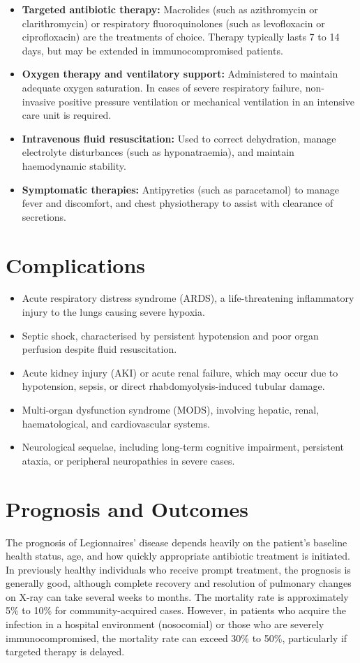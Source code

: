 \begin{itemize}
    \item \textbf{Targeted antibiotic therapy:} Macrolides (such as azithromycin or clarithromycin) or respiratory fluoroquinolones (such as levofloxacin or ciprofloxacin) are the treatments of choice. Therapy typically lasts 7 to 14 days, but may be extended in immunocompromised patients.
    \item \textbf{Oxygen therapy and ventilatory support:} Administered to maintain adequate oxygen saturation. In cases of severe respiratory failure, non-invasive positive pressure ventilation or mechanical ventilation in an intensive care unit is required.
    \item \textbf{Intravenous fluid resuscitation:} Used to correct dehydration, manage electrolyte disturbances (such as hyponatraemia), and maintain haemodynamic stability.
    \item \textbf{Symptomatic therapies:} Antipyretics (such as paracetamol) to manage fever and discomfort, and chest physiotherapy to assist with clearance of secretions.
\end{itemize}

\section*{Complications}
\begin{itemize}
    \item Acute respiratory distress syndrome (ARDS), a life-threatening inflammatory injury to the lungs causing severe hypoxia.
    \item Septic shock, characterised by persistent hypotension and poor organ perfusion despite fluid resuscitation.
    \item Acute kidney injury (AKI) or acute renal failure, which may occur due to hypotension, sepsis, or direct rhabdomyolysis-induced tubular damage.
    \item Multi-organ dysfunction syndrome (MODS), involving hepatic, renal, haematological, and cardiovascular systems.
    \item Neurological sequelae, including long-term cognitive impairment, persistent ataxia, or peripheral neuropathies in severe cases.
\end{itemize}

\section*{Prognosis and Outcomes}
The prognosis of Legionnaires' disease depends heavily on the patient's baseline health status, age, and how quickly appropriate antibiotic treatment is initiated. In previously healthy individuals who receive prompt treatment, the prognosis is generally good, although complete recovery and resolution of pulmonary changes on X-ray can take several weeks to months. The mortality rate is approximately 5\% to 10\% for community-acquired cases. However, in patients who acquire the infection in a hospital environment (nosocomial) or those who are severely immunocompromised, the mortality rate can exceed 30\% to 50\%, particularly if targeted therapy is delayed.

